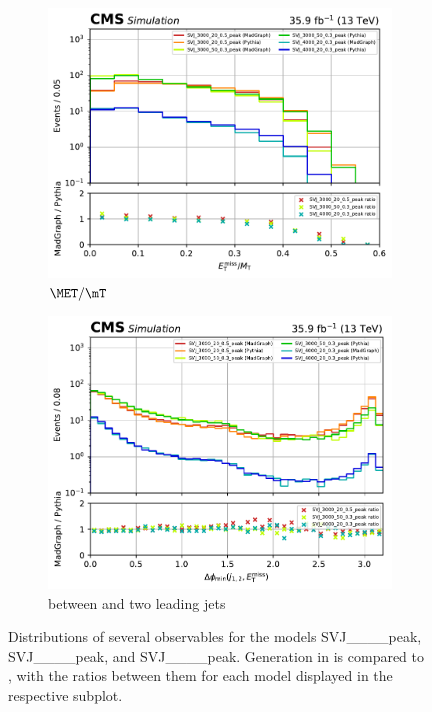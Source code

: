 \begin{figure}[htbp]
    \begin{subfigure}[b]{0.48\textwidth}
        \includegraphics[width=\textwidth]{figures/madgraph_pythia_comparisons/with_ratios/part2/met_over_mt.pdf}
        \caption{$\MET/\mT$}
    \end{subfigure}
    \hfill
    \begin{subfigure}[b]{0.48\textwidth}
        \includegraphics[width=\textwidth]{figures/madgraph_pythia_comparisons/with_ratios/part2/min_dphi.pdf}
        \caption{\mindphi between \MET and two leading \glspl{jet}}
    \end{subfigure}
    \caption[Distributions of several observables for the models SVJ\_\_\_\_\-peak, SVJ\_\_\_\_\-peak, and SVJ\_\_\_\_\-peak]{Distributions of several observables for the models SVJ\_\_\_\_\-peak, SVJ\_\_\_\_\-peak, and SVJ\_\_\_\_\-peak. Generation in \MGvATNLO is compared to \PYTHIAEIGHT, with the ratios between them for each model displayed in the respective subplot.}
    \label{fig:svj_mg_pythia_comparison_set2}
\end{figure}

